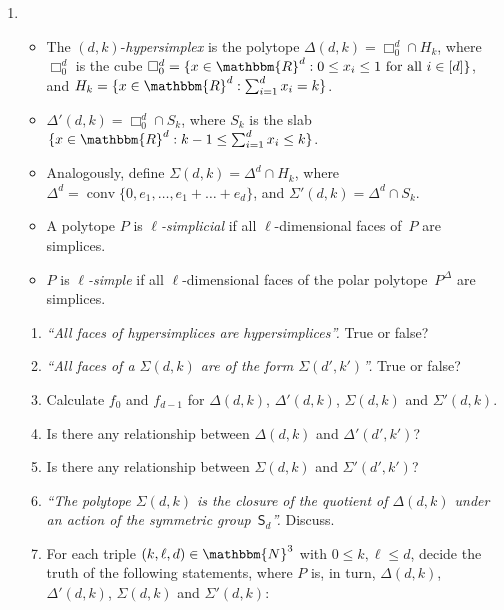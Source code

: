 \documentclass[11pt]{amsart}
\newcommand{\N}{\mathbbm{N}}
\newcommand{\R}{\mathbbm{R}}
\DeclareMathOperator{\conv}{conv}
\begin{document}
\begin{enumerate}
\setlength{\itemsep}{1ex}
\item 
    \begin{itemize}
    \item The $(d,k)$-\emph{hypersimplex} is the polytope $\Delta(d,k)=\Box_0^d\cap H_k$, where $\Box_0^d$ is the cube $\Box_0^d = \{x\in\R^d: 0\le x_i\le 1\text{ for all }i\in[d]\}$, and
$H_k=\{x\in\R^d:\sum_{i=1}^d x_i = k\}$.
\item $\Delta'(d,k)=\Box_0^d\cap S_k$, where $S_k$ is the slab $\{x\in\R^d : k-1\le\sum_{i=1}^d x_i \le k\}$.
\item Analogously, define $\Sigma(d,k)=\Delta^d\cap H_k$, where $\Delta^d=\conv\{0,e_1,\dots,e_1+\dots+e_d\}$, and $\Sigma'(d,k) = \Delta^d\cap S_k$.
\item A polytope $P$ is \emph{$\ell$-simplicial} if all $\ell$-dimensional faces of~$P$ are simplices.
\item $P$ is \emph{$\ell$-simple} if all $\ell$-dimensional faces of the polar polytope~$P^\Delta$ are simplices.
    \end{itemize}


\bigskip
\begin{enumerate}
\setlength{\itemsep}{1ex}
\item \emph{``All faces of hypersimplices are hypersimplices''.} True or false? 

\item \emph{``All faces of a $\Sigma(d,k)$ are of the form $\Sigma(d',k')$''.} True or false? 

\item Calculate $f_0$ and $f_{d-1}$ for $\Delta(d,k)$, $\Delta'(d,k)$, $\Sigma(d,k)$ and $\Sigma'(d,k)$.

\item Is there any relationship between $\Delta(d,k)$ and $\Delta'(d',k')$?

\item Is there any relationship between $\Sigma(d,k)$ and $\Sigma'(d',k')$?

\item \emph{``The polytope $\Sigma(d,k)$ is the closure of the quotient of $\Delta(d,k)$ under an action of the symmetric group~$\mathsf{S}_d$''.} Discuss.

\item For each triple $(k,\ell,d)\in\N^3$ with $0\le k,\ell\le d$, decide the truth of the following statements, where $P$ is, in turn, $\Delta(d,k)$, $\Delta'(d,k)$, $\Sigma(d,k)$ and $\Sigma'(d,k)$:


\end{enumerate}
\end{enumerate}
\end{document}
